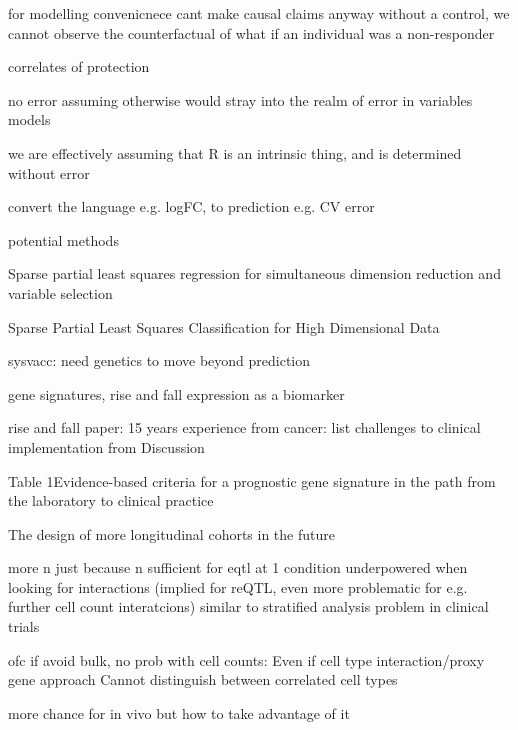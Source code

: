 \begin{outline}
        for modelling convenicnece
        cant make causal claims anyway
            without a control, we cannot observe the counterfactual of what if an individual was a non-responder

        correlates of protection

        no error
            assuming otherwise would stray into the realm of error in variables models
        
            we are effectively assuming that R is an intrinsic thing, and is determined without error
    
    convert the language e.g. logFC, to prediction e.g. CV error


    potential methods

        Sparse partial least squares regression for simultaneous dimension reduction and variable selection

         Sparse Partial Least Squares Classification for High Dimensional Data 


    sysvacc: need genetics to move beyond prediction

    gene signatures, rise and fall
        expression as a biomarker

        rise and fall paper: 15 years experience from cancer: list challenges to clinical implementation from Discussion

        Table 1Evidence-based criteria for a prognostic gene signature in the path from the laboratory to clinical practice

The design of more longitudinal cohorts in the future

    more n
        just because n sufficient for eqtl at 1 condition
        underpowered when looking for interactions (implied for reQTL, even more problematic for e.g. further cell count interatcions)
        similar to stratified analysis problem in clinical trials

    ofc if avoid bulk, no prob with cell counts:
        Even if cell type interaction/proxy gene approach
        Cannot distinguish between correlated cell types

    more chance for in vivo
        but how to take advantage of it


\end{outline}
